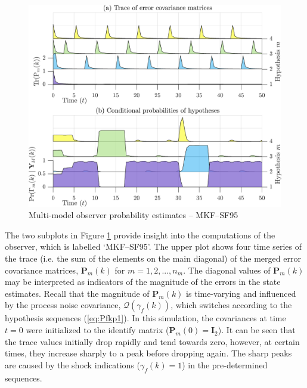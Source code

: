 \begin{figure}[htp]
	\centering
	\includegraphics[width=12cm]{images/rod_MKF_test_sim_MKF_SF95_prob.png}
	\caption{Multi-model observer probability estimates – MKF--SF95}
	\label{fig:rod-obs-sim-test-probs-SF95}
\end{figure}
The two subplots in Figure \ref{fig:rod-obs-sim-test-probs-SF95} provide insight into the computations of the observer, which is labelled `MKF--SF95'. The upper plot shows four time series of the trace (i.e. the sum of the elements on the main diagonal) of the merged error covariance matrices, $\mathbf{P}_m(k)$ for $m=1,2,...,n_m$. The diagonal values of $\mathbf{P}_m(k)$ may be interpreted as indicators of the magnitude of the errors in the state estimates. Recall that the magnitude of $\mathbf{P}_m(k)$ is time-varying and influenced by the process noise covariance, $\mathcal{Q}(\gamma_f(k))$, which switches according to the hypothesis sequences (\ref{eq:Pfkp1}). In this simulation, the covariances at time $t=0$ were initialized to the identify matrix ($\mathbf{P}_m(0)=\mathbf{I}_2$). It can be seen that the trace values initially drop rapidly and tend towards zero, however, at certain times, they increase sharply to a peak before dropping again. The sharp peaks are caused by the shock indications ($\gamma_f(k)=1$) in the pre-determined sequences.


